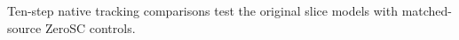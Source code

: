 Ten-step native tracking comparisons test the original slice models with matched-source ZeroSC controls.
